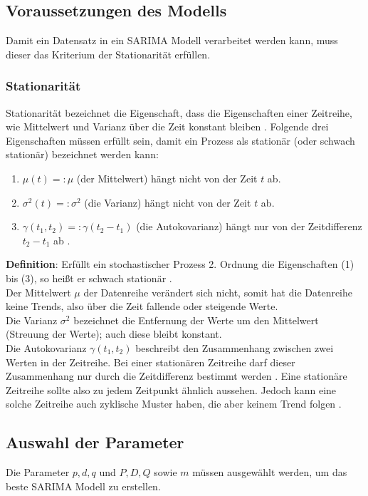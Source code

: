 \documentclass[12pt]{report}
\begin{document}
	\subsection{Voraussetzungen des Modells}
	Damit ein Datensatz in ein SARIMA Modell verarbeitet werden kann, muss dieser das Kriterium der Stationarität erfüllen. 
	\subsubsection{Stationarität}
	Stationarität bezeichnet die Eigenschaft, dass die Eigenschaften einer Zeitreihe, wie Mittelwert und Varianz über die Zeit konstant bleiben \cite[S. 26]{Vogel.2015}.
	Folgende drei Eigenschaften müssen erfüllt sein, damit ein Prozess als stationär (oder schwach stationär) bezeichnet werden kann:
	\begin{enumerate}
		\item \(\mu(t) =: \mu\) (der Mittelwert) hängt nicht von der Zeit \(t\) ab.
		\item \(\sigma^2(t) =: \sigma^2\) (die Varianz) hängt nicht von der Zeit \(t\) ab.
		\item \(\gamma(t_1, t_2) =: \gamma(t_2 - t_1)\) (die Autokovarianz) hängt nur von der Zeitdifferenz \(t_2 - t_1\) ab \cite[S. 26]{Vogel.2015}.
	\end{enumerate}
	\textbf{Definition}: Erfüllt ein stochastischer Prozess 2. Ordnung die Eigenschaften (1) bis (3), so heißt er schwach stationär \cite[S. 26]{Vogel.2015}. \\
	Der Mittelwert $\mu$ der Datenreihe verändert sich nicht, somit hat die Datenreihe keine Trends, also über die Zeit fallende oder steigende Werte. \\
	Die Varianz $\sigma^2$ bezeichnet die Entfernung der Werte um den Mittelwert (Streuung der Werte); auch diese bleibt konstant.\\
	Die Autokovarianz $\gamma(t_1, t_2)$ beschreibt den Zusammenhang zwischen zwei Werten in der Zeitreihe. Bei einer stationären Zeitreihe darf dieser Zusammenhang nur durch die Zeitdifferenz bestimmt werden \cite[S. 26]{Vogel.2015}. 
	Eine stationäre Zeitreihe sollte also zu jedem Zeitpunkt ähnlich aussehen. Jedoch kann eine solche Zeitreihe auch zyklische Muster haben, die aber keinem Trend folgen \cite[Kapitel 8.1]{Hyndman.May2018}.	
	\subsection{Auswahl der Parameter}
	Die Parameter $p, d, q$ und $P, D, Q$ sowie $m$ müssen ausgewählt werden, um das beste SARIMA Modell zu erstellen. 
	
\end{document}
